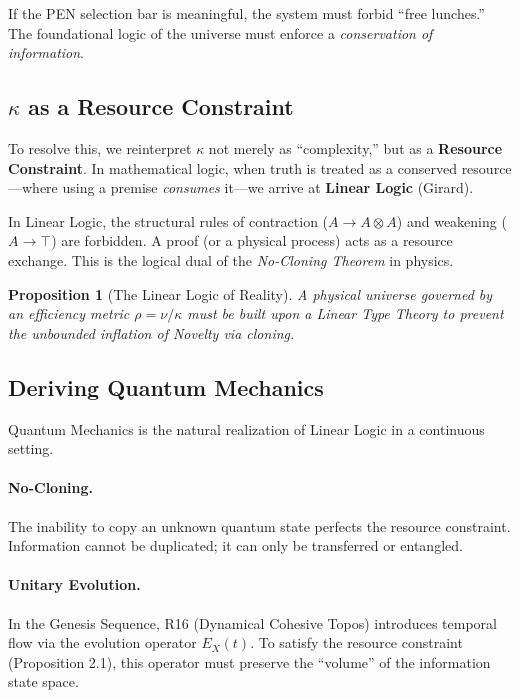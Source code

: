 \documentclass[12pt,a4paper]{article}
\newtheorem{proposition}[theorem]{Proposition}
\theoremstyle{definition}
\newcommand{\kap}{\kappa}
\begin{document}
If the PEN selection bar is meaningful, the system must forbid ``free lunches.'' The foundational logic of the universe must enforce a \emph{conservation of information}.

\subsection{$\kap$ as a Resource Constraint}

To resolve this, we reinterpret $\kap$ not merely as ``complexity,'' but as a \textbf{Resource Constraint}. In mathematical logic, when truth is treated as a conserved resource—where using a premise \emph{consumes} it—we arrive at \textbf{Linear Logic} (Girard).

In Linear Logic, the structural rules of contraction ($A \to A \otimes A$) and weakening ($A \to \top$) are forbidden. A proof (or a physical process) acts as a resource exchange. This is the logical dual of the \emph{No-Cloning Theorem} in physics.

\begin{proposition}[The Linear Logic of Reality]
A physical universe governed by an efficiency metric $\rho = \nu/\kap$ must be built upon a Linear Type Theory to prevent the unbounded inflation of Novelty via cloning.
\end{proposition}

\subsection{Deriving Quantum Mechanics}

Quantum Mechanics is the natural realization of Linear Logic in a continuous setting.

\paragraph{No-Cloning.} The inability to copy an unknown quantum state perfects the resource constraint. Information cannot be duplicated; it can only be transferred or entangled.

\paragraph{Unitary Evolution.} In the Genesis Sequence, R16 (Dynamical Cohesive Topos) introduces temporal flow via the evolution operator $E_X(t)$. To satisfy the resource constraint (Proposition 2.1), this operator must preserve the ``volume'' of the information state space.
\end{document}
